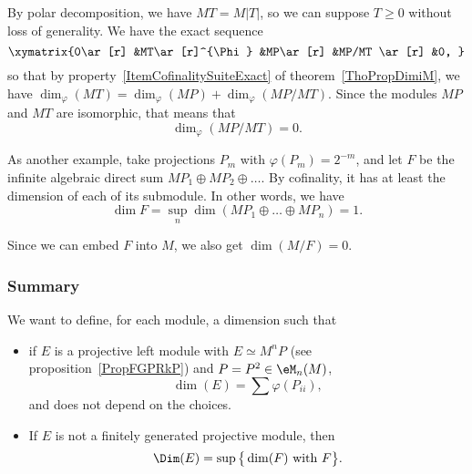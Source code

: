 By polar decomposition, we have $MT=M| T |$, so we can suppose $T\geq 0$ without loss of generality. We have the exact sequence
\[
	\xymatrix{%
		0\ar[r] 	&MT\ar[r]^{\Phi}	&MP\ar[r]	&MP/MT \ar[r]	&0,
	}
\]
so that by property~\ref{ItemCofinalitySuiteExact} of theorem~\ref{ThoPropDimiM}, we have $\dim_{\varphi}(MT)=\dim_{\varphi}(MP)+\dim_{\varphi}(MP/MT)$. Since the modules $MP$ and $MT$ are isomorphic, that means that
\[
	\dim_{\varphi}(MP/MT)=0.
\]

As another example, take projections $P_m$ with $\varphi(P_m)=2^{-m}$, and let $F$ be the infinite algebraic direct sum $MP_1\oplus MP_2\oplus\ldots$. By cofinality, it has at least the dimension of each of its submodule. In other words, we have
\[
	\dim F=\sup_n\dim(MP_1\oplus\ldots\oplus MP_n)=1.
\]

Since we can embed $F$ into $M$, we also get $\dim(M/F)=0$.

\subsubsection{Summary}

We want to define, for each module, a dimension such that
\begin{itemize}
	\item if $E$ is a projective left module with $E\simeq M^nP$ (see proposition~\ref{PropFGPRkP}) and $P=P^2\in\eM_n(M)$,
	      \[
		      \dim(E)=\sum \varphi(P_{ii}),
	      \]
	      and does not depend on the choices.
	\item If $E$ is not a finitely generated projective module, then
	      \begin{equation}		\label{DefDimAvecGrandD}
		      \Dim(E)=\sup\big\{  \dim(F)\text{ with }F \big\}.
	      \end{equation}
\end{itemize}
